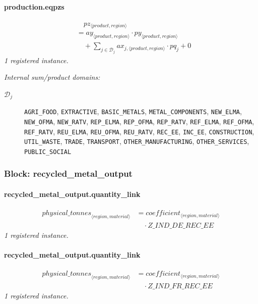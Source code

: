 \documentclass[11pt]{article}
\begin{document}
\paragraph{production.eqpzs}
\begin{align*}
&\quad pz_{\langle product, region\rangle}\\
&= ay_{\langle product, region\rangle} \cdot py_{\langle product, region\rangle}\\
&\quad {}+ \sum_{j \in \mathcal{D}_{j}} ax_{j,\langle product, region\rangle} \cdot pq_{j} + 0
\end{align*}
\noindent\emph{1 registered instance.}\par
\noindent\emph{Internal sum/product domains:}\par
\begin{description}
\item[\(\mathcal{D}_{j}\)] \texttt{AGRI\_FOOD}, \texttt{EXTRACTIVE}, \texttt{BASIC\_METALS}, \texttt{METAL\_COMPONENTS}, \texttt{NEW\_ELMA}, \texttt{NEW\_OFMA}, \texttt{NEW\_RATV}, \texttt{REP\_ELMA}, \texttt{REP\_OFMA}, \texttt{REP\_RATV}, \texttt{REF\_ELMA}, \texttt{REF\_OFMA}, \texttt{REF\_RATV}, \texttt{REU\_ELMA}, \texttt{REU\_OFMA}, \texttt{REU\_RATV}, \texttt{REC\_EE}, \texttt{INC\_EE}, \texttt{CONSTRUCTION}, \texttt{UTIL\_WASTE}, \texttt{TRADE}, \texttt{TRANSPORT}, \texttt{OTHER\_MANUFACTURING}, \texttt{OTHER\_SERVICES}, \texttt{PUBLIC\_SOCIAL}
\end{description}
\subsubsection*{Block: recycled\_metal\_output}
\paragraph{recycled\_metal\_output.quantity\_link}
\begin{align*}
{physical\_tonnes}_{\langle region, material\rangle} &= coefficient_{\langle region, material\rangle}\\
&\quad {}\cdot Z\_IND\_DE\_REC\_EE
\end{align*}
\noindent\emph{1 registered instance.}\par
\paragraph{recycled\_metal\_output.quantity\_link}
\begin{align*}
{physical\_tonnes}_{\langle region, material\rangle} &= coefficient_{\langle region, material\rangle}\\
&\quad {}\cdot Z\_IND\_FR\_REC\_EE
\end{align*}
\noindent\emph{1 registered instance.}\par
\end{document}
